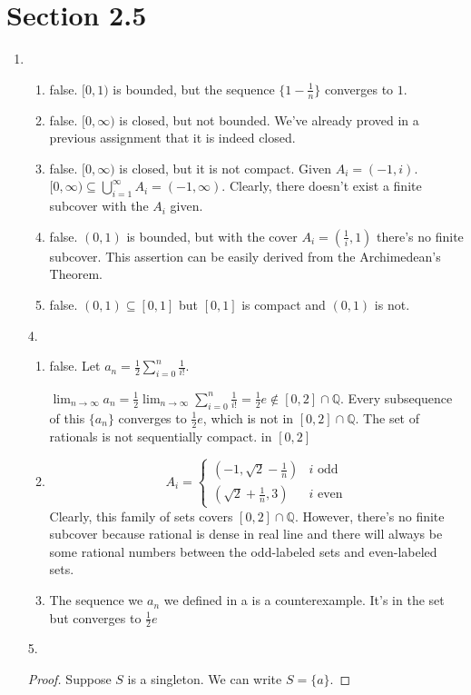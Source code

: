 \documentclass{article}
\begin{document}
\section*{Section 2.5}
\begin{enumerate}
\item
  \begin{enumerate}[label=\alph*.]
  \item false. $[0,1)$ is bounded, but the sequence
    $\{1-\frac{1}{n}\}$ converges to $1$.
  \item false. $[0,\infty)$ is closed, but not bounded. We've already
    proved in a previous assignment that it is indeed closed.
  \item false. $[0,\infty)$ is closed, but it is not
    compact. Given $A_i = (-1,i)$. $[0,\infty) \subseteq
    \bigcup_{i=1}^{\infty} A_i = (-1,\infty)$. Clearly, there doesn't
    exist a finite subcover with the $A_i$ given.
  \item false. $(0,1)$ is bounded, but with the cover $A_i =
    (\frac{1}{i},1)$ there's no finite subcover. This assertion can be easily
    derived from the Archimedean's Theorem.
  \item false. $(0,1) \subseteq [0,1]$ but $[0,1]$ is compact and
    $(0,1)$ is not.
  \end{enumerate}
\item [4.]
  \begin{enumerate}[label=\alph*.]
  \item false.
    Let $a_n =
    \frac{1}{2}\sum_{i=0}^n\frac{1}{i!}$.

    $\lim_{n\rightarrow \infty}a_n = \frac{1}{2}\lim_{n\rightarrow
      \infty}\sum_{i=0}^n\frac{1}{i!} = \frac{1}{2}e \notin
    [0,2] \cap \mathbb{Q}$. Every subsequence of this $\{a_n\}$ converges to
    $\frac{1}{2}e$, which is not in $[0,2] \cap \mathbb{Q}$. The set
    of rationals is not sequentially compact.
    in $[0,2]$ 
  \item
    \begin{equation*}
      A_i =
      \begin{cases}
        (-1, \sqrt{2} - \frac{1}{n}) & i\text{ odd}\\
        (\sqrt{2}+ \frac{1}{n}, 3) & i\text{ even}
      \end{cases}
    \end{equation*}
    Clearly, this family of sets covers $[0,2] \cap
    \mathbb{Q}$. However, there's no finite subcover because rational
    is dense in real line and there will always be some rational numbers
    between the odd-labeled sets and even-labeled sets.
  \item The sequence we $a_n$ we defined in a is a
    counterexample. It's in the set but converges to $\frac{1}{2}e$
  \end{enumerate}
\item [5.]
  \begin{proof}
    Suppose $S$ is a singleton.  We can write $S=\{a\}$.


\end{proof}
\end{enumerate}
\end{document}
